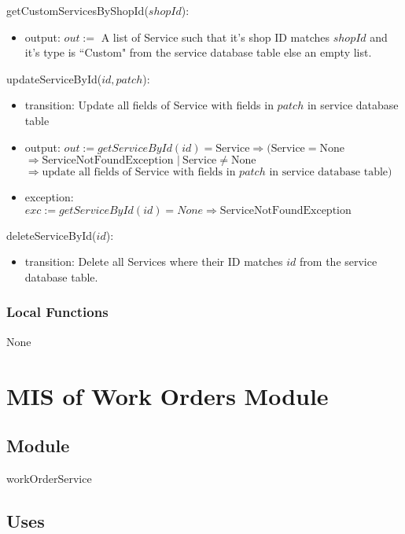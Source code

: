 \documentclass[12pt, titlepage]{article}
\begin{document}
\noindent getCustomServicesByShopId($shopId$):
\begin{itemize}
	\item output: $out :=$ A list of Service such that it's shop ID matches $shopId$ and it's type is
	      ``Custom" from the service database table else an empty list.
\end{itemize}

\noindent updateServiceById($id, patch$):
\begin{itemize}
	\item transition: Update all fields of Service with fields in $patch$ in service database table
	\item output: $out := getServiceById(id) = \text{Service} \Rightarrow (\text{Service} = \text{None} $ \\
		      $\Rightarrow \text{ServiceNotFoundException } |\ \text{Service} \neq \text{None}$ \\ $\Rightarrow
		      \text{update all fields of Service with fields in } patch \text{ in service database table})$
	\item exception: $exc := getServiceById(id) = None \Rightarrow \text{ServiceNotFoundException}$
\end{itemize}

\noindent deleteServiceById($id$):
\begin{itemize}
	\item transition: Delete all Services where their ID matches $id$ from the service database table.
\end{itemize}

\subsubsection{Local Functions}

None

\newpage

\section{MIS of Work Orders Module} \label{mWorkOrders}
\subsection{Module}

workOrderService

\subsection{Uses}
\end{document}
